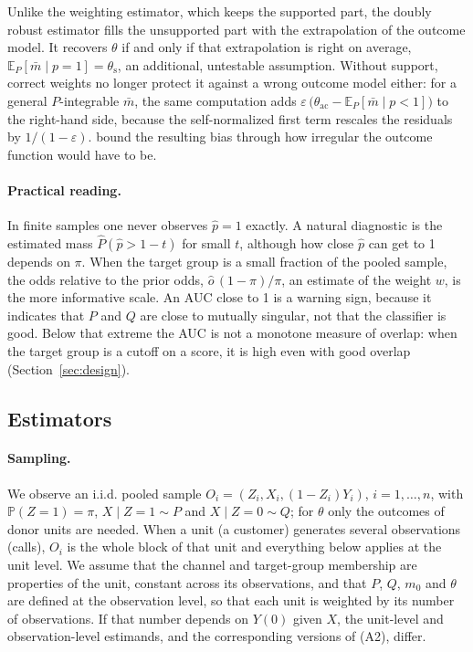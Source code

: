 \documentclass[twoside,11pt]{article}
\newcommand{\E}{\mathbb{E}}
\newcommand{\PP}{\mathbb{P}}
\newcommand{\thac}{\theta_{\mathrm{ac}}}
\newcommand{\ths}{\theta_{\mathrm{s}}}
\theoremstyle{plain}
\theoremstyle{definition}
\begin{document}
Unlike the weighting estimator, which keeps the supported part, the doubly robust estimator fills the unsupported part with the extrapolation of the outcome model. It recovers $\theta$ if and only if that extrapolation is right on average, $\E_P[\bar m\mid p=1]=\ths$, an additional, untestable assumption. Without support, correct weights no longer protect it against a wrong outcome model either: for a general $P$-integrable $\bar m$, the same computation adds $\varepsilon\,\bigl(\thac-\E_P[\bar m\mid p<1]\bigr)$ to the right-hand side, because the self-normalized first term rescales the residuals by $1/(1-\varepsilon)$. \citet{manamkoong2025} bound the resulting bias through how irregular the outcome function would have to be.

\paragraph{Practical reading.} In finite samples one never observes $\hat p=1$ exactly. A natural diagnostic is the estimated mass $\hat P(\hat p>1-t)$ for small $t$, although how close $\hat p$ can get to 1 depends on $\pi$. When the target group is a small fraction of the pooled sample, the odds relative to the prior odds, $\hat o\,(1-\pi)/\pi$, an estimate of the weight $w$, is the more informative scale. An AUC close to 1 is a warning sign, because it indicates that $P$ and $Q$ are close to mutually singular, not that the classifier is good. Below that extreme the AUC is not a monotone measure of overlap: when the target group is a cutoff on a score, it is high even with good overlap (Section~\ref{sec:design}).

\subsection{Estimators}\label{sec:estimators}

\paragraph{Sampling.} We observe an i.i.d. pooled sample $O_i=(Z_i,X_i,(1-Z_i)Y_i)$, $i=1,\dots,n$, with $\PP(Z=1)=\pi$, $X\mid Z=1\sim P$ and $X\mid Z=0\sim Q$; for $\theta$ only the outcomes of donor units are needed. When a unit (a customer) generates several observations (calls), $O_i$ is the whole block of that unit and everything below applies at the unit level. We assume that the channel and target-group membership are properties of the unit, constant across its observations, and that $P$, $Q$, $m_0$ and $\theta$ are defined at the observation level, so that each unit is weighted by its number of observations. If that number depends on $Y(0)$ given $X$, the unit-level and observation-level estimands, and the corresponding versions of (A2), differ.
\end{document}
